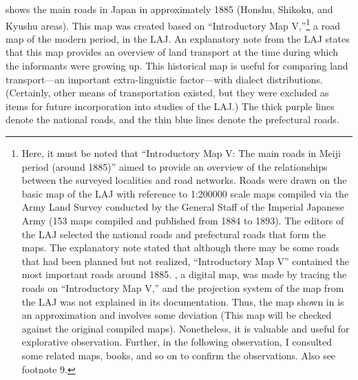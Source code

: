 \documentclass[output=paper]{LSP/langsci}
\begin{document}
 shows the main roads in Japan in approximately 1885 (Honshu, Shikoku, and Kyushu areas). This map was created based on “Introductory Map V,”\footnote{ Here, it must be noted that “Introductory Map V: The main roads in Meiji period (around 1885)” aimed to provide an overview of the relationships between the surveyed localities and road networks. Roads were drawn on the basic map of the LAJ with reference to 1:200000 scale maps compiled via the Army Land Survey conducted by the General Staff of the Imperial Japanese Army (153 maps compiled and published from 1884 to 1893). The editors of the LAJ selected the national roads and prefectural roads that form the maps. The explanatory note stated that although there may be some roads that had been planned but not realized, “Introductory Map V” contained the most important roads around 1885. , a digital map, was made by tracing the roads on “Introductory Map V,” and the projection system of the map from the LAJ was not explained in its documentation. Thus, the map shown in  is an approximation and involves some deviation (This map will be checked against the original compiled maps). Nonetheless, it is valuable and useful for explorative observation. Further, in the following observation, I consulted some related maps, books, and so on to confirm the observations. Also see footnote 9.} a road map of the modern period, in the LAJ. An explanatory note from the LAJ states that this map provides an overview of land transport at the time during which the informants were growing up. This historical map is useful for comparing land transport—an important extra-linguistic factor—with dialect distributions. (Certainly, other means of transportation existed, but they were excluded as items for future incorporation into studies of the LAJ.) The thick purple lines denote the national roads, and the thin blue lines denote the prefectural roads.
\end{document}
